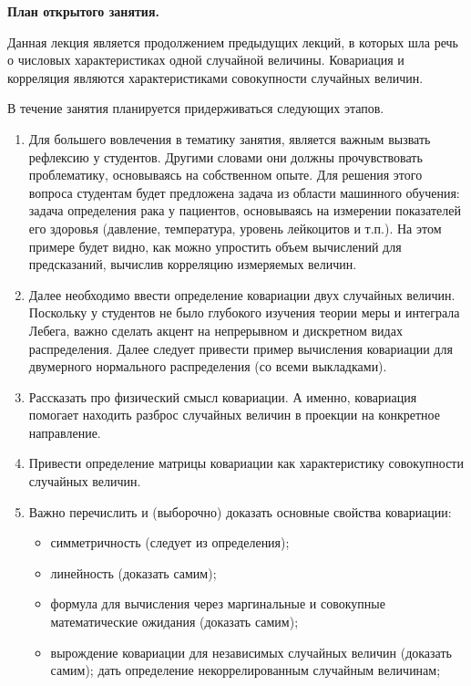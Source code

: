 \documentclass[14pt]{extarticle}
\theoremstyle{theorem}
\theoremstyle{remark}
\begin{document}
  \medskip
  \medskip
  \medskip
\textbf{План открытого занятия.}

Данная лекция является продолжением предыдущих лекций, в которых шла речь о числовых характеристиках одной случайной величины. Ковариация и корреляция являются характеристиками совокупности случайных величин.

В течение занятия планируется придерживаться следующих этапов.
\begin{enumerate}
    \item Для большего вовлечения в тематику занятия, является важным вызвать рефлексию у студентов. Другими словами они должны прочувствовать проблематику, основываясь на собственном опыте. Для решения этого вопроса студентам будет предложена задача из области машинного обучения: задача определения рака у пациентов, основываясь на измерении показателей его здоровья (давление, температура, уровень лейкоцитов и т.п.). На этом примере будет видно, как можно упростить объем вычислений для предсказаний, вычислив корреляцию измеряемых величин.
    \item Далее необходимо ввести определение ковариации двух случайных величин. Поскольку у студентов не было глубокого изучения теории меры и интеграла Лебега, важно сделать акцент на непрерывном и дискретном видах распределения. Далее следует привести пример вычисления ковариации для двумерного нормального распределения (со всеми выкладками).
    \item Рассказать про физический смысл ковариации. А именно, ковариация помогает находить разброс случайных величин в проекции на конкретное направление. 
    \item Привести определение матрицы ковариации как характеристику совокупности случайных величин. 
    \item Важно перечислить и (выборочно) доказать основные свойства ковариации:
    \begin{itemize}
        \item симметричность (следует из определения);
        \item линейность (доказать самим);
        \item формула для вычисления через маргинальные и совокупные математические ожидания (доказать самим);
        \item вырождение ковариации для независимых случайных величин (доказать самим); дать определение некоррелированным случайным величинам;

\end{itemize}
\end{enumerate}
\end{document}
